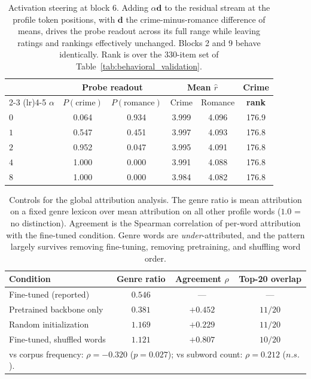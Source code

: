 \begin{table}[t]
    \centering
    \small
    \caption{Activation steering at block 6. Adding $\alpha\mathbf{d}$ to the residual stream at the profile token positions, with $\mathbf{d}$ the crime-minus-romance difference of means, drives the probe readout across its full range while leaving ratings and rankings effectively unchanged. Blocks 2 and 9 behave identically. Rank is over the $330$-item set of Table~\ref{tab:behavioral_validation}.}
    \label{tab:steering}
    \begin{tabular}{lccccc}
    \toprule
    & \multicolumn{2}{c}{\textbf{Probe readout}} & \multicolumn{2}{c}{\textbf{Mean $\hat{r}$}} & \textbf{Crime} \\
    \cmidrule(lr){2-3} \cmidrule(lr){4-5}
    $\alpha$ & $P(\text{crime})$ & $P(\text{romance})$ & Crime & Romance & \textbf{rank} \\
    \midrule
    $0$ & 0.064 & 0.934 & 3.999 & 4.096 & 176.9 \\
    $1$ & 0.547 & 0.451 & 3.997 & 4.093 & 176.8 \\
    $2$ & 0.952 & 0.047 & 3.995 & 4.091 & 176.8 \\
    $4$ & 1.000 & 0.000 & 3.991 & 4.088 & 176.8 \\
    $8$ & 1.000 & 0.000 & 3.984 & 4.082 & 176.8 \\
    \bottomrule
    \end{tabular}
\end{table}

\begin{table}[t]
    \centering
    \small
    \caption{Controls for the global attribution analysis. The genre ratio is mean attribution on a fixed genre lexicon over mean attribution on all other profile words ($1.0$ = no distinction). Agreement is the Spearman correlation of per-word attribution with the fine-tuned condition. Genre words are \emph{under}-attributed, and the pattern largely survives removing fine-tuning, removing pretraining, and shuffling word order.}
    \label{tab:attribution_controls}
    \begin{tabular}{lccc}
    \toprule
    \textbf{Condition} & \textbf{Genre ratio} & \textbf{Agreement} $\rho$ & \textbf{Top-20 overlap} \\
    \midrule
    Fine-tuned (reported)      & $0.546$ & ---      & --- \\
    Pretrained backbone only   & $0.381$ & $+0.452$ & $11/20$ \\
    Random initialization      & $1.169$ & $+0.229$ & $11/20$ \\
    Fine-tuned, shuffled words & $1.121$ & $+0.807$ & $10/20$ \\
    \bottomrule
    \multicolumn{4}{l}{\footnotesize vs corpus frequency: $\rho{=}-0.320$ ($p{=}0.027$); vs subword count: $\rho{=}0.212$ ($n.s.$).}
    \end{tabular}
\end{table}
